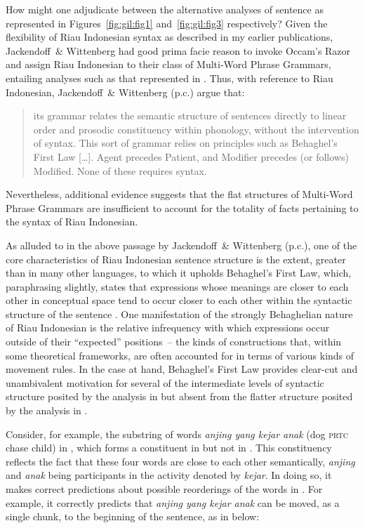 \documentclass[output=paper,colorlinks,citecolor=brown
]{langscibook}
\begin{document}
How might one adjudicate between the alternative analyses of sentence  as represented in Figures~\ref{fig:gil:fig1} and~\ref{fig:gil:fig3} respectively?  Given the flexibility of Riau Indonesian syntax as described in my earlier publications, Jackendoff~\& Wittenberg had good prima facie reason to invoke Occam's Razor and assign Riau Indonesian to their class of Multi-Word Phrase Grammars, entailing analyses such as that represented in .  Thus, with reference to Riau Indonesian, Jackendoff~\& Wittenberg (p.c.) argue that:

\begin{quote}
      its grammar relates the semantic structure of sentences directly to linear order and
     prosodic constituency within phonology, without the intervention of syntax.  This sort of
     grammar relies on principles such as Behaghel’s First Law  [\ldots]. Agent precedes Patient, and
     Modifier precedes (or follows) Modified.  None of these requires syntax.
\end{quote}

Nevertheless, additional evidence suggests that the flat structures of Multi-Word Phrase Grammars are insufficient to account for the totality of facts pertaining to the syntax of Riau Indonesian.

As alluded to in the above passage by Jackendoff~\& Wittenberg (p.c.), one of the core characteristics of Riau Indonesian sentence structure is the extent, greater than in many other languages, to which it upholds Behaghel's First Law, which, paraphrasing slightly, states that expressions whose meanings are closer to each other in conceptual space tend to occur closer to each other within the syntactic structure of the sentence \citep{behaghel1932deutsche}.  One manifestation of the strongly Behaghelian nature of Riau Indonesian is the relative infrequency with which expressions occur outside of their ``expected'' positions~– the kinds of constructions that, within some theoretical frameworks, are often accounted for in terms of various kinds of movement rules.  In the case at hand, Behaghel's First Law provides clear-cut and unambivalent motivation for several of the intermediate levels of syntactic structure posited by the analysis in  but absent from the flatter structure posited by the analysis in .

Consider, for example, the substring of words \textit{anjing yang kejar anak} (dog \textsc{prtc} chase child) in , which forms a constituent in  but not in .  This constituency reflects the fact that these four words are close to each other semantically, \textit{anjing} and \textit{anak} being participants in the activity denoted by \textit{kejar}.  In doing so, it makes correct predictions about possible reorderings of the words in .  For example, it correctly predicts that \textit{anjing yang kejar anak} can be moved, as a single chunk, to the beginning of the sentence, as in  below:
\end{document}
